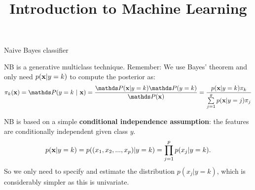 \documentclass[11pt,compress,t,notes=noshow, xcolor=table]{beamer}
\title{Introduction to Machine Learning}
\begin{document}

\framebreak

\begin{vbframe}{Naive Bayes classifier}

NB is a generative multiclass technique. Remember: We use Bayes' theorem and only need $p(\mathbf{x} | y= k)$ to compute the posterior as:
$$\pikx = \postk = \frac{\P(\xv | y = k) \P(y = k)}{\P(\xv)} = \frac{\pdfxyk \pik}{\sumjg \pdfxyk[j] \pi_j} $$


NB is based on a simple \textbf{conditional independence assumption}: the features are conditionally independent given class $y$.
$$
p(\mathbf{x} | y= k) = p((x_1, x_2, ..., x_p)|y = k)=\prod\limits_{j=1}^p p(x_j|y = k).
$$
So we only need to specify and estimate the distribution $p(x_j|y = k)$, which is considerably simpler as this is univariate.

\end{vbframe}
\end{document}

